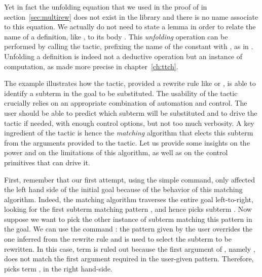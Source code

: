 Yet in fact the unfolding equation  that we used in
the proof of  in section~\ref{sec:multirew}
does not exist in the library and there is no name associate to this
equation. We actually do not need to state a lemma in order to relate
the name of a definition, like , to its body
. This \emph{unfolding} operation can be
performed by calling the  tactic, prefixing the name of the
constant with \C{/}, as in . Unfolding a definition is
indeed not a deductive operation but an instance of computation, as
made more precise in chapter~\ref{ch:ttch}.

\label{sec:rewrite2}

The example  illustrates how the  tactic, provided a
rewrite rule like  or , is able
to identify a
subterm in the goal to be substituted. The usability of the
tactic crucially relies on an appropriate combination of automation
and control. The user should be able to predict which subterm will be
substituted and to drive the tactic if needed, with enough control
options, but not too much verbosity. A key ingredient of the
 tactic is hence the \emph{matching} algorithm that
elects this subterm from the arguments provided to the tactic. Let us
provide some insights on the power and on the limitations of this
algorithm, as well as on the control primitives that can drive it.

First, remember that our first attempt, using the simple
 command, only
affected the left hand side of the initial goal because of the
behavior of this matching algorithm.
Indeed, the matching algorithm traverses the entire goal
left-to-right, looking for the first subterm matching pattern
\C{(_ <= _)},  and hence picks subterm .
Now suppose we want to pick
the other instance of subterm matching this pattern in the goal. We
can use the command : the
pattern given by the user overrides the one inferred from the rewrite
rule and is used to select the subterm to be rewritten. In this case,
term  is ruled out because the first argument of
\C{<=}, namely , does not match the first argument 
required in the user-given pattern. Therefore,  picks term
, in the right hand-side.

